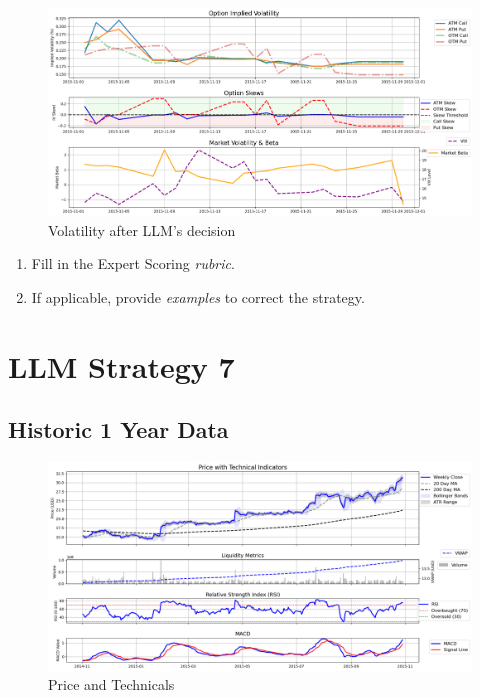 \documentclass[8pt]{scrartcl}
\begin{document}
\begin{figure}[H]
    \centering
    \includegraphics[width=1\linewidth]{judge_reviews/MSFT_M_gpt-4o-mini/2015-11-01/llm_Market_Volatility_&_Beta.png}
    \caption{Volatility after LLM's decision}
\end{figure}

\begin{tcolorbox}[colback=blue!10, colframe=blue!60, title=\textbf{TASKS}, sharp corners=southwest]
\begin{enumerate}
    \item Fill in the Expert Scoring \textit{rubric}.
    \item If applicable, provide \textit{examples} to correct the strategy.
\end{enumerate}
\end{tcolorbox}
\newpage


\section*{LLM Strategy 7}
\label{app:s7}
\subsection*{Historic 1 Year Data}

\begin{figure}[H]
    \centering
    \includegraphics[width=1\linewidth]{judge_reviews/AMZN_M_gpt-4o-mini/2015-11-01/judge_Price_with_Technical_Indicators.png}
    \caption{Price and Technicals}
\end{figure}
\end{document}
